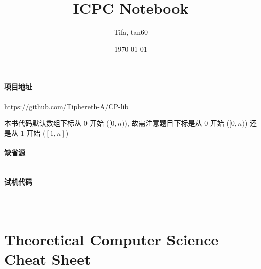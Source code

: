 \documentclass{ICPCnotebook}
\title{\vspace{-4ex}\Large{ICPC Notebook}}
\author{Tifa, tan60}
\date{\today}
\begin{document}
    \maketitle

    \pagestyle{plain}

	\setcounter{page}{1}

    \paragraph{项目地址} \url{https://github.com/Tiphereth-A/CP-lib}

    本书代码默认数组下标从 \(0\) 开始 (\([0, n)\)), 故需注意题目下标是从 \(0\) 开始 (\([0, n)\)) 还是从 \(1\) 开始 (\([1, n]\))

    \paragraph{缺省源}

    \inputminted{cpp}{src/src/main.cpp}

    \paragraph{试机代码}

    \inputminted{cpp}{src/src/test.cpp}

    \inputminted{yaml}{src/src/.clang-format}
    
    \inputminted{bash}{src/src/run.sh}
    
    \newpage
    \begin{multicols}{2}
        \tableofcontents
    \end{multicols}

    \newpage
	\pagestyle{fancy}
	\setcounter{page}{1}

    
    

    \section{Theoretical Computer Science Cheat Sheet}
    \label{sec:theoretical-computer-science-cheat-sheet}

    
    
\end{document}
